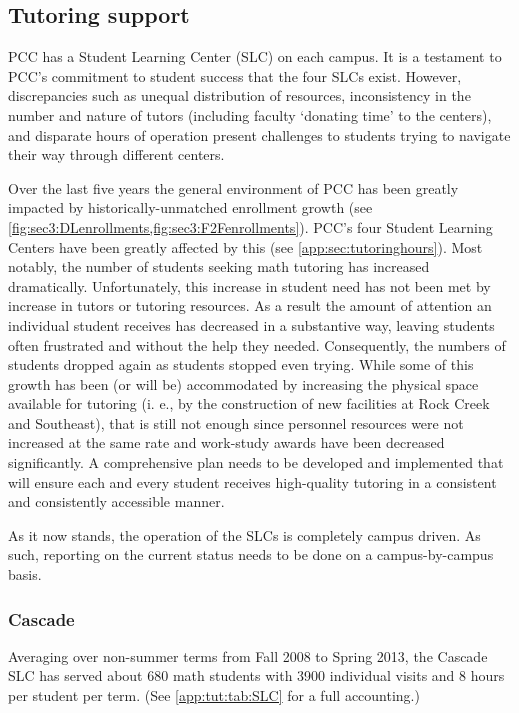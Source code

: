 \subsection{Tutoring support}
PCC has a Student Learning Center (SLC) on each campus.
It is a testament to PCC's commitment to student success that the four SLCs exist.
However, discrepancies such as unequal distribution of resources, inconsistency in the number and nature of tutors (including faculty `donating time' to the centers), and disparate hours of operation present challenges to students trying to navigate their way through different centers.


Over the last five years the general environment of PCC has been greatly impacted by historically-unmatched enrollment growth (see \vref{fig:sec3:DLenrollments,fig:sec3:F2Fenrollments}).
PCC's four Student Learning Centers have been greatly affected by this (see \vref{app:sec:tutoringhours}).
Most notably, the number of students seeking math tutoring has increased dramatically.
Unfortunately, this increase in student need has not been met by increase in tutors or tutoring resources.
As a result the amount of attention an individual student receives has decreased in a substantive way, leaving students often frustrated and without the help they needed.
Consequently, the numbers of students dropped again as students stopped even trying.
While some of this growth has been (or will be) accommodated by increasing the physical space available for tutoring (i.
e., by the
construction of new facilities at Rock Creek and Southeast),
that is still not enough since personnel resources were not increased at the
same rate and work-study awards have been decreased significantly.
A comprehensive plan needs to be developed and implemented that will ensure each and every student receives high-quality tutoring in a consistent and consistently accessible manner.

As it now stands, the operation of the SLCs is completely campus driven.
As such, reporting on the current status needs to be done on a campus-by-campus basis.

\subsubsection{Cascade}
Averaging over non-summer terms from Fall 2008 to Spring 2013, the Cascade SLC has served about 680 math students with 3900 individual visits and 8 hours per student per term.
(See \vref{app:tut:tab:SLC} for a full accounting.)

